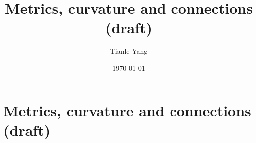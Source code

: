 \documentclass{noteformyself}
\title{Metrics, curvature and connections (draft)}
\author{Tianle Yang}
\date{\today}
\begin{document}
    \maketitle
    \section{Metrics, curvature and connections (draft)}




\end{document}
